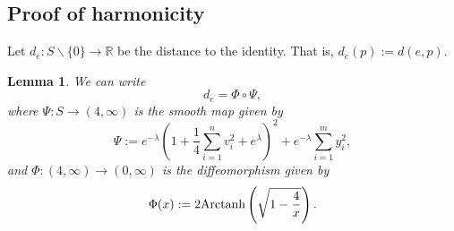 \documentclass{amsart}
\newcommand{\R}{\mathbb R}
\newcommand{\arctanh}{\text{\normalfont Arctanh}}
\theoremstyle{plain}
\newtheorem{lemma}[theorem]{Lemma}
\theoremstyle{definition}
\theoremstyle{remark}
\begin{document}
 

 	\subsection{Proof of harmonicity}
 	Let $d_e:S\backslash\{0\} \rightarrow \R$ be the distance to the identity. That is, $d_e(p) := d(e,p)$.

 
	\begin{lemma}
		We can write $$d_e = \Phi \circ \Psi,$$ where $\Psi:S \rightarrow (4,\infty)$ is the smooth map given by 
		\begin{equation}
			\Psi := e^{-\lambda} \left(1 + \frac14 \sum_{i=1}^n v_i^2 + e^\lambda\right)^2 + e^{-\lambda }\sum_{i=1}^m y_i^2, \label{psi}
		\end{equation}
		and $\Phi:(4,\infty) \rightarrow (0,\infty)$ is the diffeomorphism given by 
		$$\Phi(x) :=  2 \arctanh\left( \sqrt{1-\frac4x}\right).$$
	\end{lemma}
\end{document}
